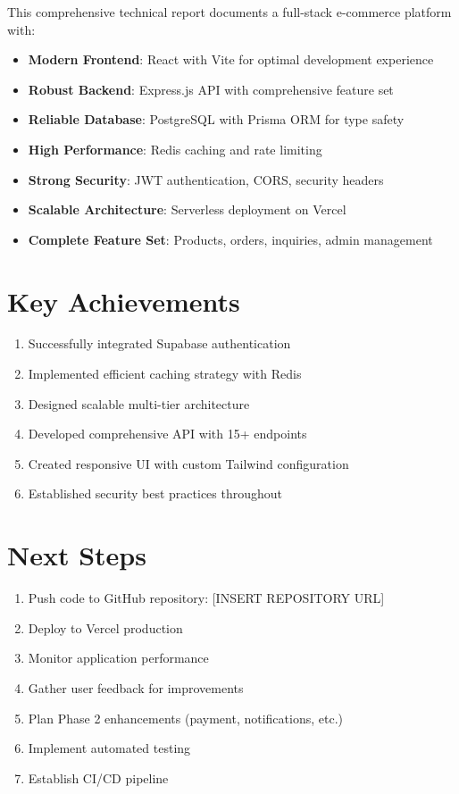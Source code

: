 \documentclass[12pt,a4paper]{report}
\begin{document}
This comprehensive technical report documents a full-stack e-commerce platform with:

\begin{itemize}
    \item \textbf{Modern Frontend}: React with Vite for optimal development experience
    \item \textbf{Robust Backend}: Express.js API with comprehensive feature set
    \item \textbf{Reliable Database}: PostgreSQL with Prisma ORM for type safety
    \item \textbf{High Performance}: Redis caching and rate limiting
    \item \textbf{Strong Security}: JWT authentication, CORS, security headers
    \item \textbf{Scalable Architecture}: Serverless deployment on Vercel
    \item \textbf{Complete Feature Set}: Products, orders, inquiries, admin management
\end{itemize}

\section{Key Achievements}

\begin{enumerate}
    \item Successfully integrated Supabase authentication
    \item Implemented efficient caching strategy with Redis
    \item Designed scalable multi-tier architecture
    \item Developed comprehensive API with 15+ endpoints
    \item Created responsive UI with custom Tailwind configuration
    \item Established security best practices throughout
\end{enumerate}

\section{Next Steps}

\begin{enumerate}
    \item Push code to GitHub repository: [INSERT REPOSITORY URL]
    \item Deploy to Vercel production
    \item Monitor application performance
    \item Gather user feedback for improvements
    \item Plan Phase 2 enhancements (payment, notifications, etc.)
    \item Implement automated testing
    \item Establish CI/CD pipeline
\end{enumerate}
\end{document}

